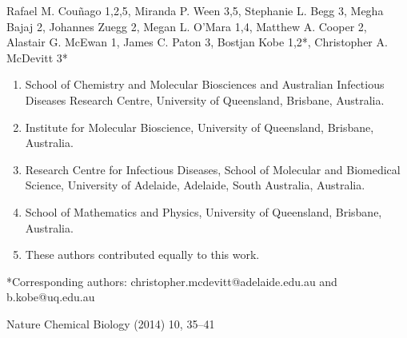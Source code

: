 Rafael M. Couñago 1,2,5, Miranda P. Ween 3,5, Stephanie L. Begg 3, Megha Bajaj 2, Johannes Zuegg 2, Megan L. O’Mara 1,4, Matthew A. Cooper 2, Alastair G. McEwan 1, James C. Paton 3, Bostjan Kobe 1,2*, Christopher A. McDevitt 3*
\begin{enumerate}
\item School of Chemistry and Molecular Biosciences and Australian Infectious Diseases Research Centre, University of Queensland, Brisbane, Australia.
\item Institute for Molecular Bioscience, University of Queensland, Brisbane, Australia.
\item Research Centre for Infectious Diseases, School of Molecular and Biomedical Science, University of Adelaide, Adelaide, South Australia, Australia.
\item School of Mathematics and Physics, University of Queensland, Brisbane, Australia.
\item These authors contributed equally to this work.
\end{enumerate}

*Corresponding authors: christopher.mcdevitt@adelaide.edu.au and b.kobe@uq.edu.au

Nature Chemical Biology (2014) 10, 35–41